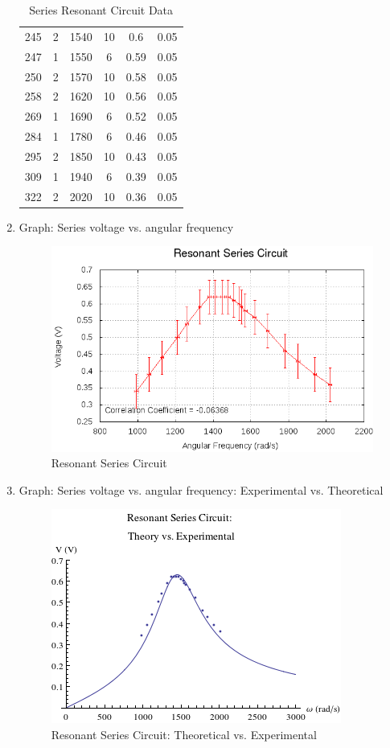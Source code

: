 \documentclass[justified]{tufte-book}
\begin{document}
\begin{enumerate}[resume]
\begin{table}[H]
\begin{tabular}{|c|c|c|c|c|c|}
245 & 2 & 1540 & 10 & 0.6  & 0.05\\
247 & 1 & 1550 & 6  & 0.59 & 0.05\\
250 & 2 & 1570 & 10 & 0.58 & 0.05\\
258 & 2 & 1620 & 10 & 0.56 & 0.05\\
269 & 1 & 1690 & 6  & 0.52 & 0.05\\
284 & 1 & 1780 & 6  & 0.46 & 0.05\\
295 & 2 & 1850 & 10 & 0.43 & 0.05\\
309 & 1 & 1940 & 6  & 0.39 & 0.05\\
322 & 2 & 2020 & 10 & 0.36 & 0.05\\
\hline
\end{tabular}
\label{tbl:RLCSeries}
\caption{Series Resonant Circuit Data}
\end{table}

\item Graph: Series voltage vs. angular frequency
  \begin{figure}[h!]
    \includegraphics{RLC-Resonant-Circuits-Series-Graph.png}
    \caption{Resonant Series Circuit}
    \label{pic:RLCseries}
  \end{figure}
\item Graph: Series voltage vs. angular frequency: Experimental vs. Theoretical
  \begin{figure}[h!]
    \center
    \includegraphics{RLC-Resonant-Circuits-Series-Graph-Mathematica.png}
    \caption{Resonant Series Circuit: Theoretical vs. Experimental}
    \label{pic:RLCseriesMathematica}
  \end{figure}


\end{enumerate}
\end{document}
